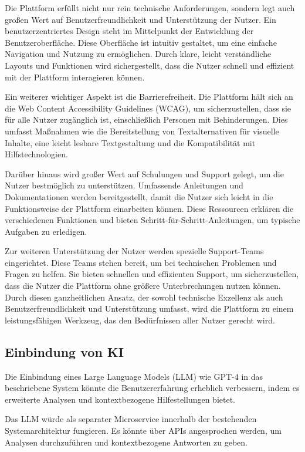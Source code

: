 \documentclass[conference]{IEEEtran}
\begin{document}
Die Plattform erfüllt nicht nur rein technische Anforderungen, sondern legt auch großen Wert auf Benutzerfreundlichkeit und Unterstützung der Nutzer. Ein benutzerzentriertes Design steht im Mittelpunkt der Entwicklung der Benutzeroberfläche. Diese Oberfläche ist intuitiv gestaltet, um eine einfache Navigation und Nutzung zu ermöglichen. Durch klare, leicht verständliche Layouts und Funktionen wird sichergestellt, dass die Nutzer schnell und effizient mit der Plattform interagieren können.

Ein weiterer wichtiger Aspekt ist die Barrierefreiheit. Die Plattform hält sich an die Web Content Accessibility Guidelines (WCAG), um sicherzustellen, dass sie für alle Nutzer zugänglich ist, einschließlich Personen mit Behinderungen. Dies umfasst Maßnahmen wie die Bereitstellung von Textalternativen für visuelle Inhalte, eine leicht lesbare Textgestaltung und die Kompatibilität mit Hilfstechnologien.

Darüber hinaus wird großer Wert auf Schulungen und Support gelegt, um die Nutzer bestmöglich zu unterstützen. Umfassende Anleitungen und Dokumentationen werden bereitgestellt, damit die Nutzer sich leicht in die Funktionsweise der Plattform einarbeiten können. Diese Ressourcen erklären die verschiedenen Funktionen und bieten Schritt-für-Schritt-Anleitungen, um typische Aufgaben zu erledigen.

Zur weiteren Unterstützung der Nutzer werden spezielle Support-Teams eingerichtet. Diese Teams stehen bereit, um bei technischen Problemen und Fragen zu helfen. Sie bieten schnellen und effizienten Support, um sicherzustellen, dass die Nutzer die Plattform ohne größere Unterbrechungen nutzen können. Durch diesen ganzheitlichen Ansatz, der sowohl technische Exzellenz als auch Benutzerfreundlichkeit und Unterstützung umfasst, wird die Plattform zu einem leistungsfähigen Werkzeug, das den Bedürfnissen aller Nutzer gerecht wird.

\subsection{Einbindung von KI}
Die Einbindung eines Large Language Models (LLM) wie GPT-4 in das beschriebene System könnte die Benutzererfahrung erheblich verbessern, indem es erweiterte Analysen und kontextbezogene Hilfestellungen bietet.


Das LLM würde als separater Microservice innerhalb der bestehenden Systemarchitektur fungieren. Es könnte über APIs angesprochen werden, um Analysen durchzuführen und kontextbezogene Antworten zu geben.
\end{document}
